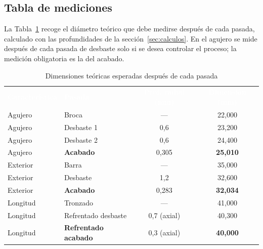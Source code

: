 \documentclass[12pt,a4paper]{article}
\newcommand{\encab}[1]{\textcolor{white}{\sffamily\bfseries #1}}
\begin{document}
\subsection{Tabla de mediciones}

La Tabla~\ref{tab:pasadas} recoge el diámetro teórico que debe medirse después
de
cada pasada, calculado con las profundidades de la sección~\ref{sec:calculos}.
En el agujero se mide después de cada pasada de desbaste solo si se desea
controlar el proceso; la medición obligatoria es la del acabado.

\begin{table}[!htb]
	\centering
	\caption{Dimensiones teóricas esperadas después de cada pasada}\label{tab:pasadas}
	\small
	\begin{tabular}{l l c c}
		\rowcolor{darkblue}
		\encab{Característica} & \encab{Pasada}              & \encab{Prof. radial (mm)} & \encab{Dimensión (mm)} \\
		Agujero                & Broca                       & ---                       & 22,000                 \\
		Agujero                & Desbaste 1                  & 0,6                       & 23,200                 \\
		Agujero                & Desbaste 2                  & 0,6                       & 24,400                 \\
		Agujero                & \textbf{Acabado}            & 0,305
		                       & \textbf{25,010}                                                                  \\
		Exterior               & Barra                       & ---
		                       & 35,000                                                                           \\
		Exterior               & Desbaste                    & 1,2
		                       & 32,600                                                                           \\
		Exterior               & \textbf{Acabado}            & 0,283
		                       & \textbf{32,034}
		\\
		Longitud               & Tronzado                    & ---
		                       & 41,000                                                                           \\
		Longitud               & Refrentado desbaste         & 0,7 (axial)
		                       & 40,300                                                                           \\
		Longitud               & \textbf{Refrentado acabado} & 0,3 (axial)
		                       & \textbf{40,000}                                                                  \\
	\end{tabular}
\end{table}
\end{document}
